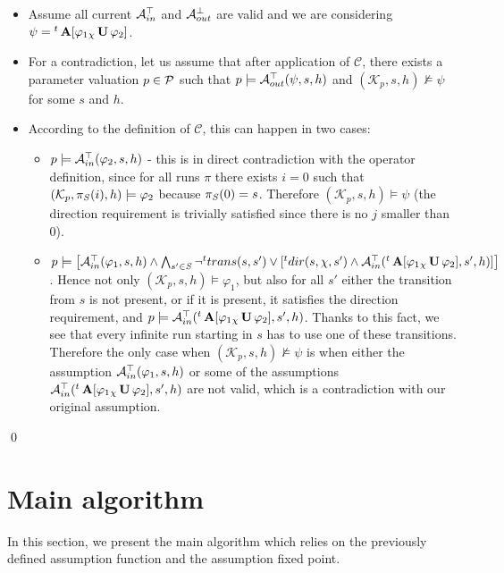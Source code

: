 \begin{itemize}
	\item Assume all current $\mathcal{A}^\top_{in}$ and $\mathcal{A}^\bot_{out}$ are valid and we are considering $ \psi = {}^{t} \operatorname{\mathbf{A}}[ \varphi_1 {}_{\chi}\operatorname{\mathbf{U}} \varphi_2 ]$.
	\item For a contradiction, let us assume that after application of $\mathcal{C}$, there exists a parameter valuation $p \in \mathcal{P}$ such that $p \models \mathcal{A}^\top_{out}(\psi, s, h)$ and $(\mathcal{K}_p, s, h) \not\models \psi$ for some $s$ and $h$.
	\item According to the definition of $\mathcal{C}$, this can happen in two cases:
	\begin{itemize}
		\item $p \models \mathcal{A}^\top_{in}(\varphi_2, s, h)$ - this is in direct contradiction with the operator definition, since for all runs $\pi$ there exists $i = 0$ such that $(\mathcal{K}_p, \pi_{\mathit{S}}(i), h) \models \varphi_2$ because $\pi_{\mathit{S}}(0) = s$. Therefore $(\mathcal{K}_p, s, h) \models \psi$ (the direction requirement is trivially satisfied since there is no $j$ smaller than $0$).
		\item $p \models \big[ \mathcal{A}^\top_{in}(\varphi_1, s, h) \land \bigwedge_{s' \in \mathit{S}} \neg{}^{t}trans(s,s') \lor [{}^{t}dir(s, \chi, s') \land \mathcal{A}^\top_{in}({}^{t}\operatorname{\mathbf{A}}[ \varphi_1 {}_{\chi}\operatorname{\mathbf{U}} \varphi_2], s', h)] \big]$. Hence not only $(\mathcal{K}_p, s, h) \models \varphi_1$, but also for all $s'$ either the transition from $s$ is not present, or if it is present, it satisfies the direction requirement, and $p \models \mathcal{A}^\top_{in}({}^{t}\operatorname{\mathbf{A}}[ \varphi_1 {}_{\chi}\operatorname{\mathbf{U}} \varphi_2], s', h)$. Thanks to this fact, we see that every infinite run starting in $s$ has to use one of these transitions. Therefore the only case when $(\mathcal{K}_p, s, h) \not\models \psi$ is when either the assumption $\mathcal{A}^\top_{in}(\varphi_1, s, h)$ or some of the assumptions $\mathcal{A}^\top_{in}({}^{t}\operatorname{\mathbf{A}}[ \varphi_1 {}_{\chi}\operatorname{\mathbf{U}} \varphi_2], s', h)$ are not valid, which is a contradiction with our original assumption.
	\end{itemize}
\end{itemize}
\qed

\section{Main algorithm}

In this section, we present the main algorithm which relies on the previously defined assumption function and the assumption fixed point.

